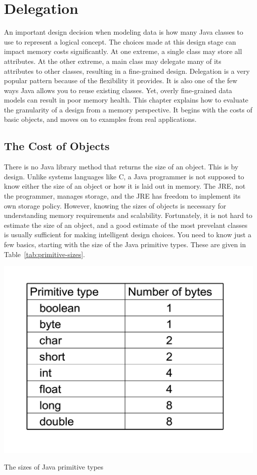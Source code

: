 \chapter{Delegation}

An important design decision when modeling data is how many Java classes to use to represent a logical concept. The choices made at this design stage can impact memory costs significantly. At one extreme, a single class may store all attributes. At the other extreme, a main class may delegate many of its attributes to other classes, resulting in a fine-grained design. Delegation is a very popular pattern because of the flexibility it provides. It is also one of the few ways Java allows you to reuse existing classes. Yet, overly fine-grained data models can result in poor memory health. This chapter explains how to evaluate the granularity of a design from a memory perspective. It begins with the costs of basic objects, and moves on to examples from real applications.
  
\section{The Cost of Objects}
\label{sec:CostOfObjects}

There is no Java library method that returns the size of an object. This is by design. Unlike systems languages like C, a Java programmer is not supposed to know either the size of an object or how it is laid out in memory. The JRE, not the programmer, manages storage, and the JRE has freedom to implement its own storage policy. However, knowing the sizes of objects is necessary for understanding memory requirements and scalability. Fortunately, it is not hard to estimate the size of an object, and a good estimate of the most prevelant classes is usually sufficient for making intelligent design choices.  You need to know just a few basics, starting with the size of the Java primitive types. These are given in Table~\ref{tab:primitive-sizes}.
\begin{table}
  \centering
 \includegraphics[width=.50\textwidth]{Figures/chapter4/primitive-byte-sizes.pdf}
  \caption{The sizes of Java primitive types}
  \label{tab:primitive-sizes}
\end{table}

